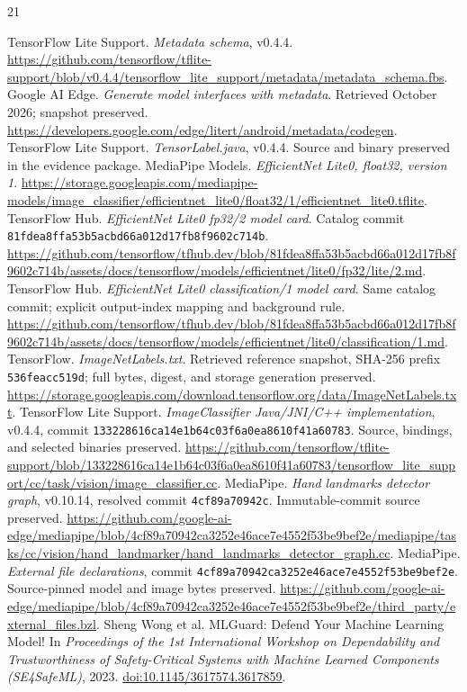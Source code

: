 \documentclass[10pt,twocolumn,letterpaper]{article}
\newcommand{\code}[1]{\texttt{#1}}
\begin{document}
\begin{thebibliography}{21}\small\raggedright
{} TensorFlow Lite Support. \emph{Metadata schema}, v0.4.4. \url{https://github.com/tensorflow/tflite-support/blob/v0.4.4/tensorflow_lite_support/metadata/metadata_schema.fbs}.
 Google AI Edge. \emph{Generate model interfaces with metadata}. Retrieved October 2026; snapshot preserved. \url{https://developers.google.com/edge/litert/android/metadata/codegen}.
 TensorFlow Lite Support. \emph{TensorLabel.java}, v0.4.4. Source and binary preserved in the evidence package.
 MediaPipe Models. \emph{EfficientNet Lite0, float32, version 1}. \url{https://storage.googleapis.com/mediapipe-models/image_classifier/efficientnet_lite0/float32/1/efficientnet_lite0.tflite}.
 TensorFlow Hub. \emph{EfficientNet Lite0 fp32/2 model card}. Catalog commit \code{81fdea8ffa53b5acbd66a012d17fb8f9602c714b}. \url{https://github.com/tensorflow/tfhub.dev/blob/81fdea8ffa53b5acbd66a012d17fb8f9602c714b/assets/docs/tensorflow/models/efficientnet/lite0/fp32/lite/2.md}.
 TensorFlow Hub. \emph{EfficientNet Lite0 classification/1 model card}. Same catalog commit; explicit output-index mapping and background rule. \url{https://github.com/tensorflow/tfhub.dev/blob/81fdea8ffa53b5acbd66a012d17fb8f9602c714b/assets/docs/tensorflow/models/efficientnet/lite0/classification/1.md}.
 TensorFlow. \emph{ImageNetLabels.txt}. Retrieved reference snapshot, SHA-256 prefix \code{536feacc519d}; full bytes, digest, and storage generation preserved. \url{https://storage.googleapis.com/download.tensorflow.org/data/ImageNetLabels.txt}.
 TensorFlow Lite Support. \emph{ImageClassifier Java/JNI/C++ implementation}, v0.4.4, commit \code{133228616ca14e1b64c03f6a0ea8610f41a60783}. Source, bindings, and selected binaries preserved. \url{https://github.com/tensorflow/tflite-support/blob/133228616ca14e1b64c03f6a0ea8610f41a60783/tensorflow_lite_support/cc/task/vision/image_classifier.cc}.
 MediaPipe. \emph{Hand landmarks detector graph}, v0.10.14, resolved commit \code{4cf89a70942c}. Immutable-commit source preserved. \url{https://github.com/google-ai-edge/mediapipe/blob/4cf89a70942ca3252e46ace7e4552f53be9bef2e/mediapipe/tasks/cc/vision/hand_landmarker/hand_landmarks_detector_graph.cc}.
 MediaPipe. \emph{External file declarations}, commit \code{4cf89a70942ca3252e46ace7e4552f53be9bef2e}. Source-pinned model and image bytes preserved. \url{https://github.com/google-ai-edge/mediapipe/blob/4cf89a70942ca3252e46ace7e4552f53be9bef2e/third_party/external_files.bzl}.
 Sheng Wong et al. MLGuard: Defend Your Machine Learning Model! In \emph{Proceedings of the 1st International Workshop on Dependability and Trustworthiness of Safety-Critical Systems with Machine Learned Components (SE4SafeML)}, 2023. \href{https://doi.org/10.1145/3617574.3617859}{doi:10.1145/3617574.3617859}.


\end{thebibliography}
\end{document}
